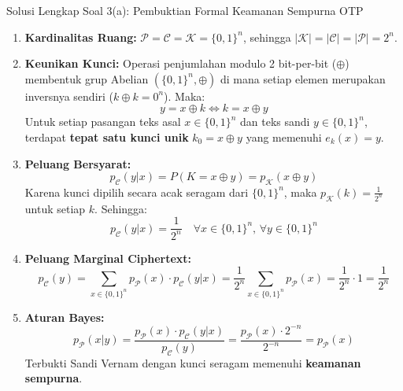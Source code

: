 \documentclass[11pt,a4paper]{article}
\begin{document}
\begin{solusibox}{Solusi Lengkap Soal 3(a): Pembuktian Formal Keamanan Sempurna OTP}
\begin{enumerate}[leftmargin=*]
    \item \textbf{Kardinalitas Ruang:} $\mathcal{P} = \mathcal{C} = \mathcal{K} = \{0, 1\}^n$, sehingga $|\mathcal{K}| = |\mathcal{C}| = |\mathcal{P}| = 2^n$.
    \item \textbf{Keunikan Kunci:} Operasi penjumlahan modulo 2 bit-per-bit ($\oplus$) membentuk grup Abelian $(\{0, 1\}^n, \oplus)$ di mana setiap elemen merupakan inversnya sendiri ($k \oplus k = 0^n$). Maka:
    \[
    y = x \oplus k \iff k = x \oplus y
    \]
    Untuk setiap pasangan teks asal $x \in \{0, 1\}^n$ dan teks sandi $y \in \{0, 1\}^n$, terdapat \textbf{tepat satu kunci unik} $k_0 = x \oplus y$ yang memenuhi $e_k(x) = y$.
    \item \textbf{Peluang Bersyarat:}
    \[
    p_{\mathcal{C}}(y|x) = P(K = x \oplus y) = p_{\mathcal{K}}(x \oplus y)
    \]
    Karena kunci dipilih secara acak seragam dari $\{0, 1\}^n$, maka $p_{\mathcal{K}}(k) = \frac{1}{2^n}$ untuk setiap $k$. Sehingga:
    \[
    p_{\mathcal{C}}(y|x) = \frac{1}{2^n} \quad \forall x \in \{0, 1\}^n, \, \forall y \in \{0, 1\}^n
    \]
    \item \textbf{Peluang Marginal Ciphertext:}
    \[
    p_{\mathcal{C}}(y) = \sum_{x \in \{0, 1\}^n} p_{\mathcal{P}}(x) \cdot p_{\mathcal{C}}(y|x) = \frac{1}{2^n} \sum_{x \in \{0, 1\}^n} p_{\mathcal{P}}(x) = \frac{1}{2^n} \cdot 1 = \frac{1}{2^n}
    \]
    \item \textbf{Aturan Bayes:}
    \[
    p_{\mathcal{P}}(x|y) = \frac{p_{\mathcal{P}}(x) \cdot p_{\mathcal{C}}(y|x)}{p_{\mathcal{C}}(y)} = \frac{p_{\mathcal{P}}(x) \cdot 2^{-n}}{2^{-n}} = p_{\mathcal{P}}(x)
    \]
    Terbukti Sandi Vernam dengan kunci seragam memenuhi \textbf{keamanan sempurna}.
\end{enumerate}
\end{solusibox}

\vspace{0.3cm}
\end{document}
